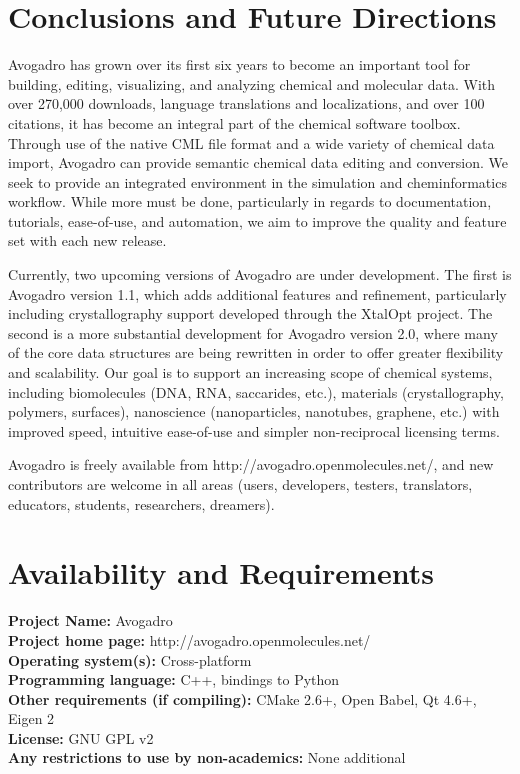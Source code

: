 \documentclass[10pt]{bmc_article}
\newenvironment{bmcformat}{\begin{raggedright}
  \baselineskip20pt\sloppy\setboolean{publ}{false}}{\end{raggedright}
  \baselineskip20pt\sloppy}
\begin{document}
\begin{bmcformat}
\section*{Conclusions and Future Directions}

Avogadro has grown over its first six years to become an important
tool for building, editing, visualizing, and analyzing chemical and
molecular data. With over 270,000 downloads,
language translations and localizations, and over 100 citations, it
has become an integral part of the chemical software toolbox. Through
use of the native CML file format and a wide variety of chemical data
import, Avogadro can provide semantic chemical data editing and conversion.
We seek to provide an integrated environment in the simulation and
cheminformatics workflow. While more must be done, particularly in
regards to documentation, tutorials, ease-of-use, and automation, we
aim to improve the quality and feature set with each new release.

Currently, two upcoming versions of Avogadro are under development. The
first is Avogadro version 1.1, which adds additional features and
refinement, particularly including crystallography support developed
through the XtalOpt project. The second is a more substantial
development for Avogadro version 2.0, where many of the core data
structures are being rewritten in order to offer greater flexibility and
scalability. Our goal is to support an increasing scope of chemical
systems, including biomolecules (DNA, RNA, saccarides, etc.),
materials (crystallography, polymers, surfaces), nanoscience
(nanoparticles, nanotubes, graphene, etc.) with improved speed, intuitive
ease-of-use and simpler non-reciprocal licensing terms.

Avogadro is freely available from http://avogadro.openmolecules.net/,
and new contributors are welcome in all areas (users, developers,
testers, translators, educators, students, researchers, dreamers).

\section*{Availability and Requirements}

\textbf{Project Name:} Avogadro \\
\textbf{Project home page:} http://avogadro.openmolecules.net/ \\
\textbf{Operating system(s):} Cross-platform \\
\textbf{Programming language:} C++, bindings to Python \\
\textbf{Other requirements (if compiling):} CMake 2.6+, Open Babel, Qt 4.6+,
Eigen 2 \\
\textbf{License:} GNU GPL v2 \\
\textbf{Any restrictions to use by non-academics:} None additional


\end{bmcformat}
\end{document}
